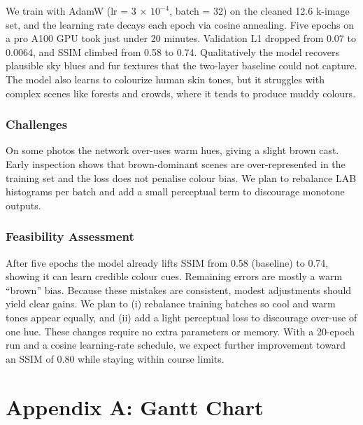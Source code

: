 \documentclass{article} %
\begin{document}
We train with AdamW (lr = 3 × $10^{-4}$, batch = 32) on the cleaned 12.6 k-image set, and the learning rate decays each epoch via cosine annealing. Five epochs on a pro A100 GPU took just under 20 minutes. Validation L1 dropped from 0.07 to 0.0064, and SSIM climbed from 0.58 to 0.74. Qualitatively the model recovers plausible sky blues and fur textures that the two-layer baseline could not capture. The model also learns to colourize human skin tones, but it struggles with complex scenes like forests and crowds, where it tends to produce muddy colours.

\subsubsection{Challenges}

On some photos the network over-uses warm hues, giving a slight brown cast. Early inspection shows that brown-dominant scenes are over-represented in the training set and the loss does not penalise colour bias. We plan to rebalance LAB histograms per batch and add a small perceptual term to discourage monotone outputs.

\subsubsection{Feasibility Assessment}

After five epochs the model already lifts SSIM from 0.58 (baseline) to 0.74, showing it can learn credible colour cues. Remaining errors are mostly a warm “brown” bias. Because these mistakes are consistent, modest adjustments should yield clear gains. We plan to (i) rebalance training batches so cool and warm tones appear equally, and (ii) add a light perceptual loss to discourage over-use of one hue. These changes require no extra parameters or memory. With a 20-epoch run and a cosine learning-rate schedule, we expect further improvement toward an SSIM of 0.80 while staying within course limits.

\label{last_page}

\newpage



\newpage
\section{Appendix A: Gantt Chart}
\end{document}
